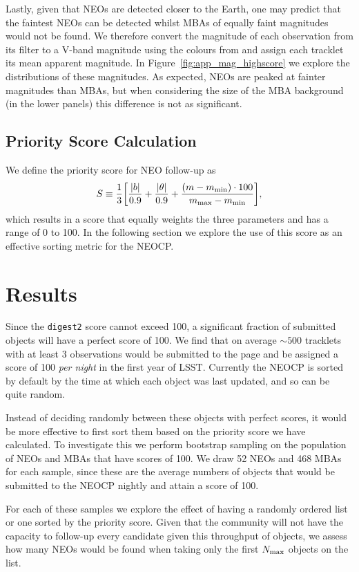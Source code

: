 \documentclass[twocolumn]{aastex631}
\newcommand{\dig}{\texttt{digest2}}
\begin{document}
Lastly, given that NEOs are detected closer to the Earth, one may predict that the faintest NEOs can be detected whilst MBAs of equally faint magnitudes would not be found. We therefore convert the magnitude of each observation from its filter to a V-band magnitude using the colours from \citet{Jones+2018} and assign each tracklet its mean apparent magnitude. In Figure~\ref{fig:app_mag_highscore} we explore the distributions of these magnitudes. As expected, NEOs are peaked at fainter magnitudes than MBAs, but when considering the size of the MBA background (in the lower panels) this difference is not as significant.\clearpage

\subsection{Priority Score Calculation}
\noindent We define the priority score for NEO follow-up as
\begin{equation}
    S \equiv \frac{1}{3} \qty[\frac{|b|}{0.9} + \frac{|\theta|}{0.9} + \frac{(m - m_{\rm min}) \cdot 100}{m_{\rm max} - m_{\rm min}}],
\end{equation}
which results in a score that equally weights the three parameters and has a range of 0 to 100. In the following section we explore the use of this score as an effective sorting metric for the NEOCP.

\section{Results}

Since the \dig{} score cannot exceed 100, a significant fraction of submitted objects will have a perfect score of 100. We find that on average ${\sim}500$ tracklets with at least 3 observations would be submitted to the page and be assigned a score of 100 \emph{per night} in the first year of LSST. Currently the NEOCP is sorted by default by the time at which each object was last updated, and so can be quite random.

Instead of deciding randomly between these objects with perfect scores, it would be more effective to first sort them based on the priority score we have calculated. To investigate this we perform bootstrap sampling on the population of NEOs and MBAs that have scores of 100. We draw 52 NEOs and 468 MBAs for each sample, since these are the average numbers of objects that would be submitted to the NEOCP nightly and attain a score of 100.

For each of these samples we explore the effect of having a randomly ordered list or one sorted by the priority score. Given that the community will not have the capacity to follow-up every candidate given this throughput of objects, we assess how many NEOs would be found when taking only the first $N_{\rm max}$ objects on the list.
\end{document}
